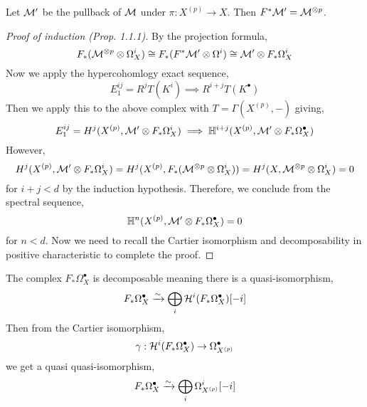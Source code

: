 \documentclass[12pt]{article}
\begin{document}
\begin{cor}
Let $\mathcal{M}'$ be the pullback of $\mathcal{M}$ under $\pi : X^{(p)} \to X$. Then $F^* \mathcal{M}' = \mathcal{M}^{\otimes p}$. 
\end{cor}

\begin{proof}[Proof of induction (Prop. 1.1.1)]
By the projection formula,
\[ F_*(\mathcal{M}^{\otimes p} \otimes \Omega^i_X) \cong F_*(F^* \mathcal{M}' \otimes \Omega^i) \cong \mathcal{M}' \otimes F_* \Omega_X^i \] 
Now we apply the hypercohomlogy exact sequence,
\[ E^{ij}_1 = R^j T(K^i) \implies R^{i+j} T(K^\bullet) \]
Then we apply this to the above complex with $T = \Gamma(X^{(p)}, -)$ giving,
\[ E^{ij}_1 = H^j(X^{(p)}, \mathcal{M}' \otimes F_* \Omega^i_X) \implies \mathbb{H}^{i+j}(X^{(p)}, \mathcal{M}' \otimes F_* \Omega^\bullet_X) \]
However,
\[ H^j(X^{(p)}, \mathcal{M}' \otimes F_* \Omega^i_X) = H^j(X^{(p)}, F_*(\mathcal{M}^{\otimes p} \otimes \Omega_X^i)) = H^j(X, \mathcal{M}^{\otimes p} \otimes \Omega^i_X) = 0 \]
for $i + j < d$ by the induction hypothesis. Therefore, we conclude from the spectral sequence,
\[ \mathbb{H}^{n}(X^{(p)}, \mathcal{M}' \otimes F_* \Omega^\bullet_X) = 0 \]
for $n < d$. Now we need to recall the Cartier isomorphism and decomposability in positive characteristic to complete the proof.
\end{proof}

\begin{prop}
The complex $F_* \Omega^\bullet_X$ is decomposable meaning there is a quasi-isomorphism,
\[ F_* \Omega^\bullet_X \xrightarrow{\sim} \bigoplus_{i} \mathcal{H}^i(F_* \Omega^\bullet_X )[-i] \]
Then from the Cartier isomorphism,
\[ \gamma : \mathcal{H}^i(F_* \Omega^\bullet_X) \to \Omega^\bullet_{X^{(p)}} \]
we get a quasi quasi-isomorphism,
\[ F_* \Omega^\bullet_{X} \xrightarrow{\sim} \bigoplus_i \Omega^i_{X^{(p)}} [-i] \]
\end{prop}
\end{document}
